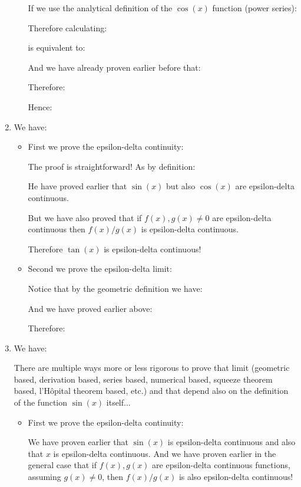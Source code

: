 \begin{enumerate}
\begin{itemize}
			If we use the analytical definition of the $\cos(x)$ function (power series):
			
			Therefore calculating:
			
			is equivalent to:
			
			And we have already proven earlier before that:
			
			Therefore:
			
			Hence:
			
		\end{itemize}
		
		\item We have:
		
		
		\begin{itemize}
			\item First we prove the epsilon-delta continuity:
			
			The proof is straightforward! As by definition:
			
			He have proved earlier that $\sin(x)$ but also $\cos(x)$ are epsilon-delta continuous.
			
			But we have also proved that if $f(x),g(x)\neq 0$ are epsilon-delta continuous then $f(x)/g(x)$ is epsilon-delta continuous. 
			
			Therefore $\tan(x)$ is epsilon-delta continuous!
			
			\item Second we prove the epsilon-delta limit:
			
			Notice that by the geometric definition we have:
			
			And we have proved earlier above:
			
			Therefore:
			
		\end{itemize}
		
		\item We have:
		
		There are multiple ways more or less rigorous to prove that limit (geometric based, derivation based, series based, numerical based, squeeze theorem based, l'Hôpital theorem based, etc.) and that depend also on the definition of the function $\sin(x)$ itself...
		\begin{itemize}
			\item First we prove the epsilon-delta continuity:
			
			We have proven earlier that $\sin(x)$ is epsilon-delta continuous and also that $x$ is epsilon-delta continuous. And we have proven earlier in the general case that if $f(x),g(x)$ are epsilon-delta continuous functions, assuming $g(x)\neq 0$, then $f(x)/g(x)$ is also epsilon-delta continuous!
			

\end{itemize}
\end{enumerate}
